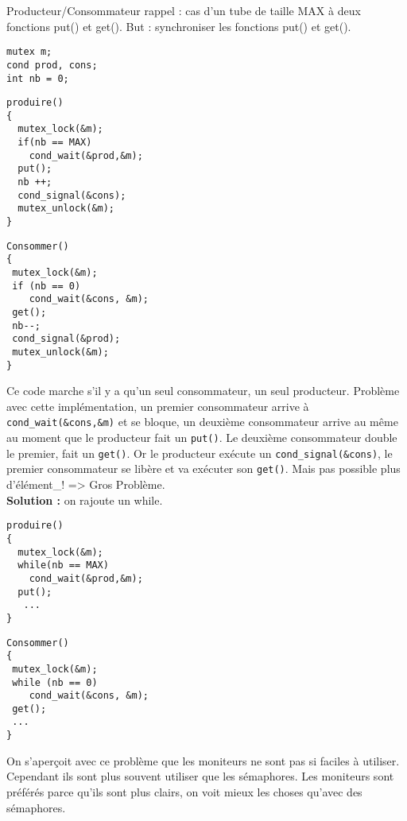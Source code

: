 \documentclass[12pt,a4paper]{report}
\begin{document}
Producteur/Consommateur
rappel : cas d'un tube de taille MAX à deux fonctions put() et get(). But : synchroniser les fonctions put() et get().

\verb?mutex m;?\\
\verb?cond prod, cons;?\\
\verb?int nb = 0;?\\
\begin{minipage}{0.5\linewidth}
\begin{verbatim}
produire()
{
  mutex_lock(&m);
  if(nb == MAX)
    cond_wait(&prod,&m);
  put();
  nb ++;
  cond_signal(&cons);
  mutex_unlock(&m);
}
\end{verbatim}
\end{minipage}
\begin{minipage}{0.5\linewidth}
\begin{verbatim}
Consommer()
{
 mutex_lock(&m);
 if (nb == 0)
    cond_wait(&cons, &m);
 get();
 nb--;
 cond_signal(&prod);
 mutex_unlock(&m);
}
\end{verbatim}
\end{minipage}
Ce code marche s'il y a qu'un seul consommateur, un seul producteur.
Problème avec cette implémentation, un premier consommateur arrive à  \verb?cond_wait(&cons,&m)? et se bloque, un deuxième consommateur arrive au même au moment que le producteur fait un \verb?put()?. Le deuxième consommateur double le premier, fait un \verb?get()?. Or le producteur exécute un \verb?cond_signal(&cons)?, le premier consommateur se libère et va exécuter son \verb?get()?. Mais pas possible plus d'élément_! => Gros Problème.\\

\textbf{Solution :} on rajoute un while.\\
\begin{minipage}{0.5\linewidth}
\begin{verbatim}
produire()
{
  mutex_lock(&m);
  while(nb == MAX)
    cond_wait(&prod,&m);
  put();
   ...
}
\end{verbatim}
\end{minipage}
\begin{minipage}{0.5\linewidth}
\begin{verbatim}
Consommer()
{
 mutex_lock(&m);
 while (nb == 0)
    cond_wait(&cons, &m);
 get();
 ...
}
\end{verbatim}
\end{minipage}


On s’aperçoit avec ce problème que les moniteurs ne sont pas si faciles à utiliser. Cependant ils sont plus souvent utiliser que les sémaphores. Les moniteurs sont préférés parce qu'ils sont plus clairs, on voit mieux les choses qu'avec des sémaphores.\\
\end{document}
